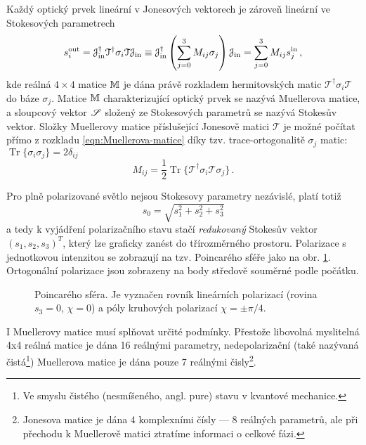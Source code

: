 Každý optický prvek lineární v Jonesových vektorech je zároveň lineární ve Stokesových parametrech
\begin{equation} 
\label{eqn:Muellerova-matice}
s^\textrm{out}_i=\mathcal{J}_\textrm{in}^\dagger \mathcal{T}^\dagger \sigma_i \mathcal{T} \mathcal{J}_\textrm{in}\equiv\mathcal{J}^\dagger_\textrm{in} \left(\sum_{j=0}^{3} M_{ij} \sigma_j \right) \mathcal{J}_\textrm{in}
    =\sum_{j=0}^{3} M_{ij} s^\textrm{in}_j \,,
\end{equation}
kde reálná $4\times 4$ matice $\mathbb{M}$ je dána právě rozkladem hermitovských matic $\mathcal{T}^\dagger \sigma_i \mathcal{T}$ do báze $\sigma_j$.
Matice $\mathbb{M}$ charakterizující optický prvek se nazývá Muellerova matice, a sloupcový vektor $\mathscr{S}$ složený ze Stokesových parametrů se nazývá Stokesův vektor.
Složky Muellerovy matice příslušející Jonesově matici $\mathcal{T}$ je možné počítat přímo z rozkladu \eqref{eqn:Muellerova-matice} díky tzv. trace-ortogonalitě $\sigma_j$ matic: $\operatorname{Tr}\lbrace\sigma_i\sigma_j\rbrace=2\delta_{ij}$
\begin{equation} 
\label{eqn:Mueller-rozklad}
    M_{ij}=\frac{1}{2}\operatorname{Tr}\lbrace \mathcal{T}^\dagger \sigma_i \mathcal{T} \sigma_j \rbrace \,.
\end{equation}

Pro plně polarizované světlo nejsou Stokesovy parametry nezávislé, platí totiž
\begin{equation} 
\label{e:norma S}
    s_0=\sqrt{s_1^2+s_2^2+s_3^2}
\end{equation}
a tedy k vyjádření polarizačního stavu stačí \emph{redukovaný} Stokesův vektor $(s_1, s_2, s_3)^T$, který lze graficky zanést do třírozměrného prostoru.
Polarizace s jednotkovou intenzitou se zobrazují na tzv. Poincarého sféře jako na obr. \ref{fig:Poincareho-sfera}.
Ortogonální polarizace jsou zobrazeny na body středově souměrné podle počátku.

\begin{figure}[htbp]
    \centering
    
    \caption{Poincarého sféra. Je vyznačen rovník lineárních polarizací (rovina $s_3=0$, $\chi=0$) a póly kruhových polarizací $\chi=\pm \pi/4$.}
    \label{fig:Poincareho-sfera}
\end{figure}

I Muellerovy matice musí splňovat určité podmínky.
Přestože libovolná myslitelná 4x4 reálná matice je dána 16 reálnými parametry, nedepolarizační (také nazývaná čistá\footnote{Ve smyslu čistého (nesmíšeného, angl. pure) stavu v kvantové mechanice.}) Muellerova matice je dána pouze 7 reálnými čisly\footnote{Jonesova matice je dána 4 komplexními čísly --- 8 reálných parametrů, ale při přechodu k Muellerově matici ztratíme informaci o celkové fázi.}. \cite{ossikovskiDifferentialMatrixFormalism2011}

